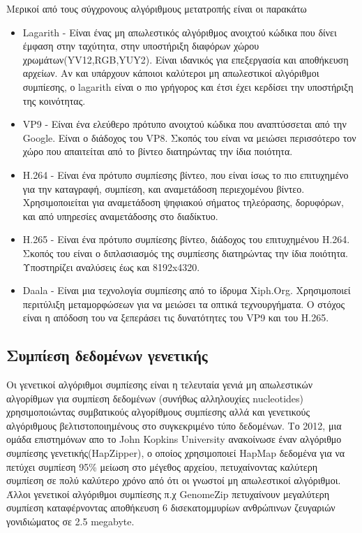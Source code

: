 Μερικοί από τους σύγχρονους αλγόριθμους μετατροπής είναι οι παρακάτω
\begin{itemize}
\item Lagarith - Είναι ένας μη απωλεστικός αλγόριθμος ανοιχτού κώδικα που δίνει έμφαση στην ταχύτητα, στην υποστήριξη διαφόρων χώρου χρωμάτων(YV12,RGB,YUY2). Είναι ιδανικός για επεξεργασία και αποθήκευση αρχείων. Αν και υπάρχουν κάποιοι καλύτεροι μη απωλεστικοί αλγόριθμοι συμπίεσης, ο lagarith είναι ο πιο γρήγορος και έτσι έχει κερδίσει την υποστήριξη της κοινότητας.
\item VP9 - Είναι ένα ελεύθερο πρότυπο ανοιχτού κώδικα που αναπτύσσεται από την Google. Είναι ο διάδοχος του VP8. Σκοπός του είναι να μειώσει περισσότερο τον χώρο που απαιτείται από το βίντεο διατηρώντας την ίδια ποιότητα. 
\item H.264 - Είναι ένα πρότυπο συμπίεσης βίντεο, που είναι ίσως το πιο επιτυχημένο για την καταγραφή, συμπίεση, και αναμετάδοση περιεχομένου βίντεο. Χρησιμοποιείται για αναμετάδοση ψηφιακού σήματος τηλεόρασης, δορυφόρων, και από υπηρεσίες αναμετάδοσης στο διαδίκτυο.
\item H.265 - Είναι ένα πρότυπο συμπίεσης βίντεο, διάδοχος του επιτυχημένου H.264. Σκοπός του είναι ο διπλασιασμός της συμπίεσης διατηρώντας την ίδια ποιότητα. Υποστηρίζει αναλύσεις έως και 8192x4320.
\item Daala - Είναι μια τεχνολογία συμπίεσης από το ίδρυμα Xiph.Org. Χρησιμοποιεί περιτύλιξη μεταμορφώσεων για να μειώσει τα οπτικά τεχνουργήματα. Ο στόχος είναι η απόδοση του να ξεπεράσει τις δυνατότητες του VP9 και του H.265. 
\end{itemize}

\subsection{Συμπίεση δεδομένων γενετικής}
Οι γενετικοί αλγόριθμοι συμπίεσης είναι η τελευταία γενιά μη απωλεστικών αλγορίθμων για συμπίεση δεδομένων (συνήθως αλληλουχίες nucleotides) χρησιμοποιώντας συμβατικούς αλγορίθμους συμπίεσης αλλά και γενετικούς αλγόριθμους βελτιστοποιημένους στο συγκεκριμένο τύπο δεδομένων. Το 2012, μια ομάδα επιστημόνων απο το John Kopkins University ανακοίνωσε έναν αλγόριθμο συμπίεσης γενετικής(HapZipper), ο οποίος χρησιμοποιεί HapMap δεδομένα για να πετύχει συμπίεση 95\% μείωση στο μέγεθος αρχείου, πετυχαίνοντας καλύτερη συμπίεση σε πολύ καλύτερο χρόνο από ότι οι γνωστοί μη απωλεστικοί αλγόριθμοι. Άλλοι γενετικοί αλγόριθμοι συμπίεσης π.χ GenomeZip πετυχαίνουν μεγαλύτερη συμπίεση καταφέρνοντας αποθήκευση 6 δισεκατομμυρίων ανθρώπινων ζευγαριών γονιδιώματος σε 2.5 megabyte.

